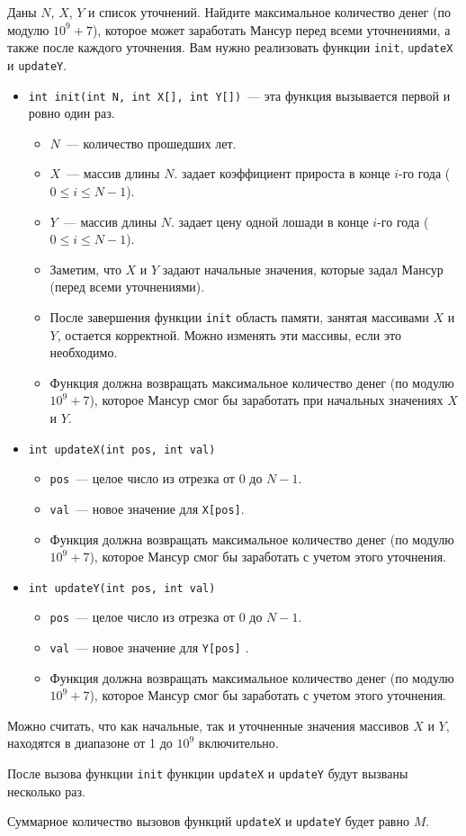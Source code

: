 Даны $N$, $X$, $Y$ и список уточнений. Найдите максимальное количество денег (по модулю
$10^9 + 7$), которое может заработать Мансур перед всеми уточнениями, а также после
каждого уточнения. Вам нужно реализовать функции \texttt{init}, \texttt{updateX} и \texttt{updateY}.
\begin{itemize}
\item \texttt{int init(int\ N, int\ X[], int\ Y[])}~--- эта функция вызывается первой и ровно один раз.
\begin{itemize}
\item $N$~--- количество прошедших лет.
\item $X$~--- массив длины $N$. задает коэффициент прироста в конце $i$-го года ($0 \le i \le N - 1$).
\item $Y$~--- массив длины $N$. задает цену одной лошади в конце $i$-го года ($0 \le i \le N - 1$).
\item Заметим, что $X$ и $Y$ задают начальные значения, которые задал Мансур (перед
всеми уточнениями).
\item После завершения функции \texttt{init} область памяти, занятая массивами $X$ и $Y$,
остается корректной. Можно изменять эти массивы, если это необходимо.
\item Функция должна возвращать максимальное количество денег (по модулю $10^9 + 7$),
которое Мансур смог бы заработать при начальных значениях $X$ и $Y$.
\end{itemize}
\item \texttt{int updateX(int\ pos, int\ val)}
\begin{itemize}
\item \texttt{pos}~--- целое число из отрезка от $0$ до $N - 1$.
\item \texttt{val}~--- новое значение для \texttt{X[pos]}.
\item Функция должна возвращать максимальное количество денег (по модулю $10^9 + 7$),
которое Мансур смог бы заработать с учетом этого уточнения.
\end{itemize}
\item \texttt{int updateY(int\ pos, int\ val)}
\begin{itemize}
\item \texttt{pos}~--- целое число из отрезка от $0$ до $N - 1$.
\item \texttt{val}~--- новое значение для \texttt{Y[pos]} .
\item Функция должна возвращать максимальное количество денег (по модулю $10^9 + 7$),
которое Мансур смог бы заработать с учетом этого уточнения.
\end{itemize}
\end{itemize}

Можно считать, что как начальные, так и уточненные значения массивов $X$ и $Y$,
находятся в диапазоне от 1 до $10^9$ включительно.

После вызова функции \texttt{init} функции \texttt{updateX} и \texttt{updateY} будут вызваны несколько раз.

Суммарное количество вызовов функций \texttt{updateX} и \texttt{updateY} будет равно $M$.



